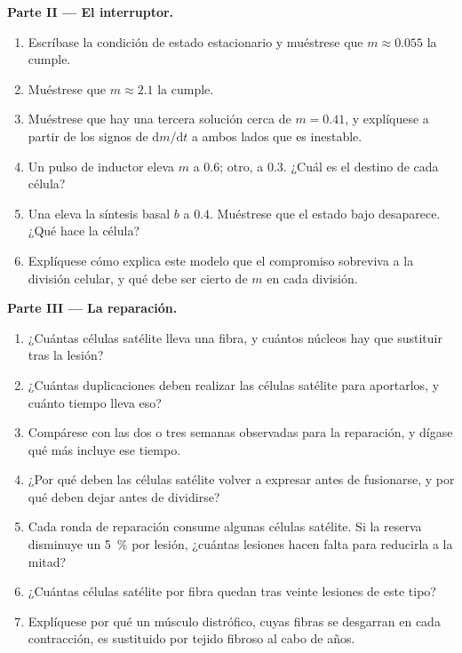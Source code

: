 \begin{problem}
\medskip
\noindent\textbf{Parte II --- El interruptor.}
\begin{enumerate}[resume]
  \item Escríbase la condición de estado estacionario y muéstrese que $m \approx
        0.055$ la cumple.
  \item Muéstrese que $m \approx 2.1$ la cumple.
  \item Muéstrese que hay una tercera solución cerca de $m = 0.41$, y
        explíquese a partir de los signos de $\mathrm{d}m/\mathrm{d}t$ a
        ambos lados que es inestable.
  \item Un pulso de inductor eleva $m$ a $0.6$; otro, a $0.3$. ¿Cuál es el
        destino de cada célula?
  \item Una  eleva la síntesis basal $b$ a $0.4$. Muéstrese que el
        estado bajo desaparece. ¿Qué hace la célula?
  \item Explíquese cómo explica este modelo que el compromiso sobreviva a
        la división celular, y qué debe ser cierto de $m$ en cada división.
\end{enumerate}

\medskip
\noindent\textbf{Parte III --- La reparación.}
\begin{enumerate}[resume]
  \item ¿Cuántas células satélite lleva una fibra, y cuántos núcleos hay
        que sustituir tras la lesión?
  \item ¿Cuántas duplicaciones deben realizar las células satélite para
        aportarlos, y cuánto tiempo lleva eso?
  \item Compárese con las dos o tres semanas observadas para la
        reparación, y dígase qué más incluye ese tiempo.
  \item ¿Por qué deben las células satélite volver a expresar  antes de
        fusionarse, y por qué deben dejar antes de dividirse?
  \item Cada ronda de reparación consume algunas células satélite. Si la
        reserva disminuye un \qty{5}{\%} por lesión, ¿cuántas lesiones
        hacen falta para reducirla a la mitad?
  \item ¿Cuántas células satélite por fibra quedan tras veinte lesiones
        de este tipo?
  \item Explíquese por qué un músculo distrófico, cuyas fibras se
        desgarran en cada contracción, es sustituido por tejido fibroso al
        cabo de años.
\end{enumerate}


\end{problem}
